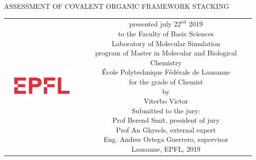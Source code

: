 \begin{titlepage}
\begin{center}
\sffamily


\null\vspace{2cm}
{\huge ASSESSMENT OF COVALENT ORGANIC FRAMEWORK STACKING\\[12pt] } 
    
\vfill

\begin{tabular}{cc}
\parbox{0.3\textwidth}{\includegraphics[width=4cm]{images/EPFL_Logo.pdf}}
&
\parbox{0.7\textwidth}{%
	presented july $22^{nd}$ 2019\\
	to the Faculty of Basic Sciences\\
	Laboratory of Molecular Simulation\\
	program of Master in Molecular and Biological Chemistry\\
%
	École Polytechnique Fédérale de Lausanne\\[6pt]
	for the grade of Chemist\\
	by\\ [4pt]
	\null \hspace{3em} Viterbo Victor\\[9pt]
%
\small
Submitted to the jury:\\[4pt]
%
    Prof Berend Smit, president of jury\\
    Prof An Ghysels, external expert\\
    Eng. Andres Ortega Guerrero, supervisor\\
%
Lausanne, EPFL, 2019}
\end{tabular}
\end{center}
\vspace{2cm}
\end{titlepage}



